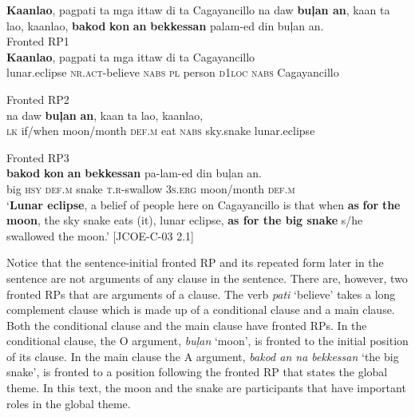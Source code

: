 \ea 
\label{bkm:Ref372792644}
\textbf{Kaanlao},  pagpati  ta  mga  ittaw  di  ta  Cagayancillo na  daw  \textbf{buļan  an},  kaan  ta  lao,  kaanlao, \textbf{bakod}  \textbf{kon}  \textbf{an} \textbf{bekkessan}  palam-ed  din  buļan  an. \\\smallskip
Fronted RP1 \\
\gll \textbf{Kaanlao},  pagpati  ta  mga  ittaw  di  ta  Cagayancillo\\
lunar.eclipse \textsc{nr.act}-believe \textsc{nabs} \textsc{pl}  person \textsc{d}1\textsc{loc}  \textsc{nabs} Cagayancillo\\\smallskip

\hspace{1.8cm}Fronted RP2 \\
\gll na  daw  \textbf{buļan}  \textbf{an},  kaan  ta  lao,  kaanlao, \\
\textsc{lk}  if/when  moon/month  \textsc{def.m}  eat  \textsc{nabs}  sky.snake  lunar.eclipse \\\smallskip
 {}

Fronted RP3 \\
\gll \textbf{bakod}  \textbf{kon}  \textbf{an}  \textbf{bekkessan}  pa-lam-ed  din  buļan  an. \\
big  \textsc{hsy}  \textsc{def.m}  snake  \textsc{t.r}-swallow  3\textsc{s.erg}  moon/month  \textsc{def.m} \\
\glt `\textbf{Lunar eclipse}, a belief of people here on Cagayancillo is that when \textbf{as} \textbf{for} \textbf{the} \textbf{moon}, the sky snake eats (it), lunar eclipse, \textbf{as for the big snake} s/he swallowed the moon.’ [JCOE-C-03 2.1]
\z

Notice that the sentence-initial fronted RP and its repeated form later in the sentence are not  arguments of any clause in the sentence. There are, however, two fronted RPs that are arguments of a clause. The verb \textit{pati} ‘believe’ takes a long complement clause which is made  up of a conditional clause and a main clause. Both the conditional clause and the main clause have fronted RPs. In the conditional clause, the O argument, \textit{buļan} ‘moon’, is fronted to the initial position of its clause. In the main clause the A argument, \textit{bakod an na bekkessan} ‘the big snake’, is fronted to a position following the fronted RP that states the global theme. In this text, the moon and the snake are participants that have important roles in the global theme.

